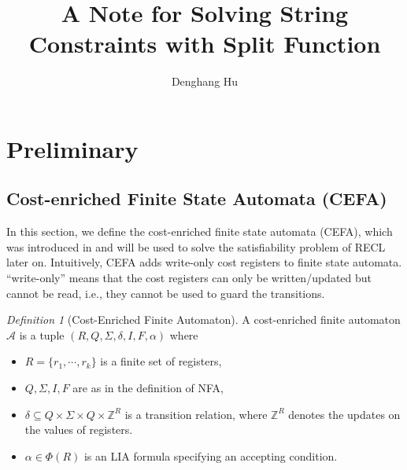 \documentclass[12pt]{article}
\title{A Note for Solving String Constraints with Split Function}
\author{Denghang Hu}
\newcommand*{\aut}{\mathcal{A}}
\newcommand*{\Int}{\mathbb{Z}}
\newcommand*{\myvec}[1]{\vec{#1}}
\theoremstyle{remark}
\newtheorem{definition}{Definition}[section]
\begin{document}
\maketitle

\section{Preliminary}
\subsection{Cost-enriched Finite State Automata (CEFA)}
In this section, we define the cost-enriched finite state automata (CEFA), which was introduced in \cite{atva2020} and will be used to solve the satisfiability problem of RECL later on. 
%
Intuitively, CEFA adds write-only cost registers to finite state automata. ``write-only'' means that the cost registers can only be written/updated but cannot be read, i.e., they cannot be used to guard the transitions. 

%
\vspace{-0.5mm}
\begin{definition}[Cost-Enriched Finite Automaton]
    A cost-enriched finite automaton $\aut$ is a tuple $(R, Q, \Sigma, \delta, I, F, \alpha)$ where
    \begin{itemize}
        \item $R = \{r_1, \cdots, r_k\}$ is a finite set of registers,
        \item $Q, \Sigma, I, F$ are as in the definition of NFA,
        \item $\delta \subseteq Q \times \Sigma \times Q \times \Int^R$ is a transition relation, where $\Int^R$ denotes the updates on the values of registers.
        \item $\alpha \in \Phi(R)$ is an LIA formula specifying an accepting condition.
    \end{itemize}
\end{definition}
\vspace{-0.5mm}
\end{document}
